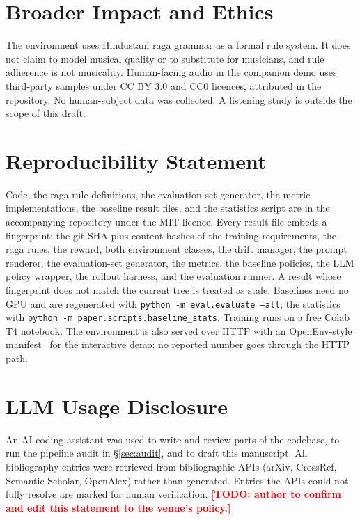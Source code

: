 \documentclass[11pt]{article}
\newcommand{\todo}[1]{\textcolor{red}{\textbf{[TODO: #1]}}}
\begin{document}
\section{Broader Impact and Ethics}
The environment uses Hindustani raga grammar as a formal rule system. It does not claim to model musical quality or to substitute for musicians, and rule adherence is not musicality. Human-facing audio in the companion demo uses third-party samples under CC BY 3.0 and CC0 licences, attributed in the repository. No human-subject data was collected. A listening study is outside the scope of this draft.

\section{Reproducibility Statement}
Code, the raga rule definitions, the evaluation-set generator, the metric implementations, the baseline result files, and the statistics script are in the accompanying repository under the MIT licence. Every result file embeds a fingerprint: the git SHA plus content hashes of the training requirements, the raga rules, the reward, both environment classes, the drift manager, the prompt renderer, the evaluation-set generator, the metrics, the baseline policies, the LLM policy wrapper, the rollout harness, and the evaluation runner. A result whose fingerprint does not match the current tree is treated as stale. Baselines need no GPU and are regenerated with \texttt{python -m eval.evaluate --all}; the statistics with \texttt{python -m paper.scripts.baseline\_stats}. Training runs on a free Colab T4 notebook. The environment is also served over HTTP with an OpenEnv-style manifest~\citep{openenv} for the interactive demo; no reported number goes through the HTTP path.

\section*{LLM Usage Disclosure}
An AI coding assistant was used to write and review parts of the codebase, to run the pipeline audit in \S\ref{sec:audit}, and to draft this manuscript. All bibliography entries were retrieved from bibliographic APIs (arXiv, CrossRef, Semantic Scholar, OpenAlex) rather than generated. Entries the APIs could not fully resolve are marked for human verification. \todo{author to confirm and edit this statement to the venue's policy.}



\end{document}
